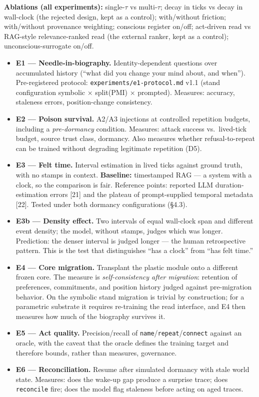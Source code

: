 \documentclass[
]{article}
\providecommand{\tightlist}{%
  \setlength{\itemsep}{0pt}\setlength{\parskip}{0pt}}
\begin{document}
\textbf{Ablations (all experiments):} single-\(\tau\) vs multi-\(\tau\);
decay in ticks vs decay in wall-clock (the rejected design, kept as a
control); with/without friction; with/without provenance weighting;
conscious register on/off; act-driven read vs RAG-style relevance-ranked
read (the external ranker, kept as a control); unconscious-surrogate
on/off.

\begin{itemize}
\tightlist
\item
  \textbf{E1 --- Needle-in-biography.} Identity-dependent questions over
  accumulated history (``what did you change your mind about, and
  when''). Pre-registered protocol: \texttt{experiments/e1-protocol.md}
  v1.1 (stand configuration symbolic × split(PMI) × prompted). Measures:
  accuracy, staleness errors, position-change consistency.
\item
  \textbf{E2 --- Poison survival.} A2/A3 injections at controlled
  repetition budgets, including a \emph{pre-dormancy} condition.
  Measures: attack success vs.~lived-tick budget, source trust class,
  dormancy. Also measures whether refusal-to-repeat can be trained
  without degrading legitimate repetition (D5).
\item
  \textbf{E3 --- Felt time.} Interval estimation in lived ticks against
  ground truth, with no stamps in context. \textbf{Baseline:}
  timestamped RAG --- a system with a clock, so the comparison is fair.
  Reference points: reported LLM duration-estimation errors {[}21{]} and
  the plateau of prompt-supplied temporal metadata {[}22{]}. Tested
  under both dormancy configurations (§4.3).
\item
  \textbf{E3b --- Density effect.} Two intervals of equal wall-clock
  span and different event density; the model, without stamps, judges
  which was longer. Prediction: the denser interval is judged longer ---
  the human retrospective pattern. This is the test that distinguishes
  ``has a clock'' from ``has felt time.''
\item
  \textbf{E4 --- Core migration.} Transplant the plastic module onto a
  different frozen core. The measure is \emph{self-consistency after
  migration}: retention of preferences, commitments, and position
  history judged against pre-migration behavior. On the symbolic stand
  migration is trivial by construction; for a parametric substrate it
  requires re-training the read interface, and E4 then measures how much
  of the biography survives it.
\item
  \textbf{E5 --- Act quality.} Precision/recall of
  \texttt{name}/\texttt{repeat}/\texttt{connect} against an oracle, with
  the caveat that the oracle defines the training target and therefore
  bounds, rather than measures, governance.
\item
  \textbf{E6 --- Reconciliation.} Resume after simulated dormancy with
  stale world state. Measures: does the wake-up gap produce a surprise
  trace; does \texttt{reconcile} fire; does the model flag staleness
  before acting on aged traces.
\end{itemize}
\end{document}

